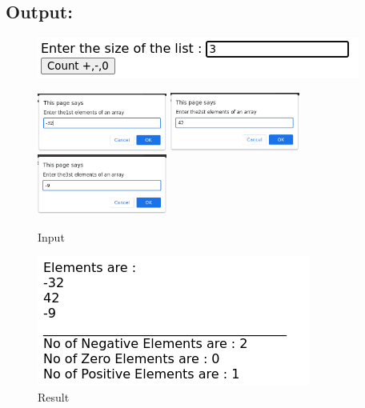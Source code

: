 \documentclass[12pt, a4paper]{article}
\begin{document}
\subsection*{Output:}
\setcounter{figure}{0}
\begin{figure}[h]
  \centering
  \includegraphics{38}
  \vskip10pt

  \includegraphics[width=0.38\textwidth]{39}\hskip10pt
  \includegraphics[width=0.38\textwidth]{40}
  \includegraphics[width=0.38\textwidth]{41}
  \caption{Input}
\end{figure}

\begin{figure}[h]
  \centering
  \includegraphics{42}
  \caption{Result}
\end{figure}

\pagebreak
\end{document}
